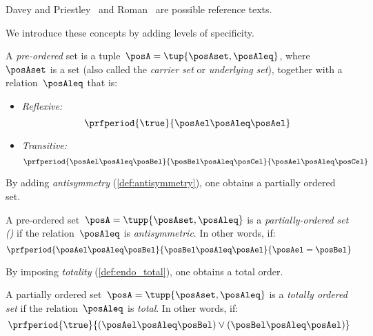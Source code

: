 Davey and Priestley~\cite{davey02} and Roman~\cite{roman08} are possible reference texts.

We introduce these concepts by adding levels of specificity.

\begin{definition}
    \label{def:preorder}
    A \emph{pre-ordered} set is a tuple~$\posA = \tup{\posAset,\posAleq}$, where~$\posAset$ is a set (also called the \emph{carrier set} or \emph{underlying set}), together with a relation~$\posAleq$ that is:
    \begin{itemize}
        \item \emph{Reflexive:}
              \begin{equation}
                  \prfperiod{\true}{\posAel \posAleq \posAel}
              \end{equation}
        \item \emph{Transitive:}
              \begin{equation}
                  \prfperiod{\posAel \posAleq \posBel}{\posBel \posAleq \posCel}{\posAel \posAleq \posCel}
              \end{equation}
    \end{itemize}
\end{definition}
By adding \emph{antisymmetry} (\cref{def:antisymmetry}), one obtains a partially ordered set.
\begin{ctdefinition}
    \label{def:poset}
    A pre-ordered set~$\posA = \tupp{\posAset,\posAleq}$ is a \emph{partially-ordered set ()} if the relation~$\posAleq$ is \emph{antisymmetric}.
    In other words, if:
    \begin{equation}
        \prfperiod{\posAel \posAleq \posBel}{\posBel \posAleq \posAel}{\posAel = \posBel}
    \end{equation}
\end{ctdefinition}

By imposing \emph{totality} (\cref{def:endo_total}), one obtains a total order.

\begin{ctdefinition}
    \label{def:total_order}
    A partially ordered set~$\posA = \tupp{\posAset,\posAleq}$ is a \emph{totally ordered set} if the relation~$\posAleq$ is \emph{total}.
    In other words, if:
    \begin{equation}
        \prfperiod{\true}{(\posAel \posAleq \posBel) \vee (\posBel \posAleq \posAel)}
    \end{equation}
\end{ctdefinition}

